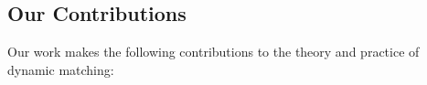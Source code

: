 \subsection*{Our Contributions}

Our work makes the following contributions to the theory and practice of dynamic matching:

